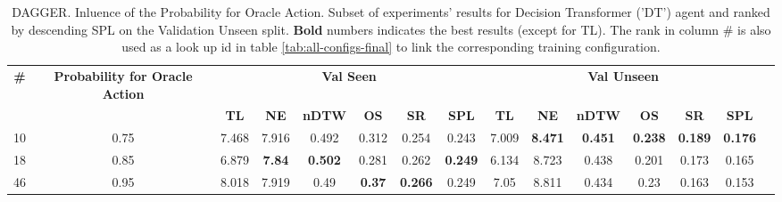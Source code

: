 \begin{table}
\centering
\caption{\label{tab:dt_dagger_prob}DAGGER. Inluence of the Probability for Oracle Action. Subset of experiments' results for Decision Transformer ('DT') agent and ranked by descending SPL on the Validation Unseen split. \textbf{Bold} numbers indicates the best results (except for TL). The rank in column \# is also used as a look up id in table \ref{tab:all-configs-final} to link the corresponding training configuration.}
\begin{tabular}{@{\hskip3pt}c@{\hskip3pt}c@{\hskip3pt}c@{\hskip3pt}c@{\hskip3pt}c@{\hskip3pt}c@{\hskip3pt}c@{\hskip3pt}c@{\hskip3pt}c@{\hskip3pt}c@{\hskip3pt}c@{\hskip3pt}c@{\hskip3pt}c@{\hskip3pt}c@{\hskip3pt}c}
\toprule
                                  \textbf{\#} & \textbf{Probability for Oracle Action} & \multicolumn{6}{c}{\textbf{Val Seen}} & \multicolumn{6}{c}{\textbf{Val Unseen}} \\
\cmidrule(l){3-8}\cmidrule(l){9-14}\textbf{~} &                             \textbf{~} &       \textbf{TL} &    \textbf{NE} &   \textbf{nDTW} &    \textbf{OS} &     \textbf{SR} &    \textbf{SPL} &         \textbf{TL} &     \textbf{NE} &   \textbf{nDTW} &     \textbf{OS} &     \textbf{SR} &    \textbf{SPL} \\
\midrule
                                           10 &                                   0.75 &             7.468 &          7.916 &           0.492 &          0.312 &           0.254 &           0.243 &               7.009 &  \textbf{8.471} &  \textbf{0.451} &  \textbf{0.238} &  \textbf{0.189} &  \textbf{0.176} \\
                                           18 &                                   0.85 &             6.879 &  \textbf{7.84} &  \textbf{0.502} &          0.281 &           0.262 &  \textbf{0.249} &               6.134 &           8.723 &           0.438 &           0.201 &           0.173 &           0.165 \\
                                           46 &                                   0.95 &             8.018 &          7.919 &            0.49 &  \textbf{0.37} &  \textbf{0.266} &           0.249 &                7.05 &           8.811 &           0.434 &            0.23 &           0.163 &           0.153 \\
\bottomrule
\end{tabular}
\end{table}

